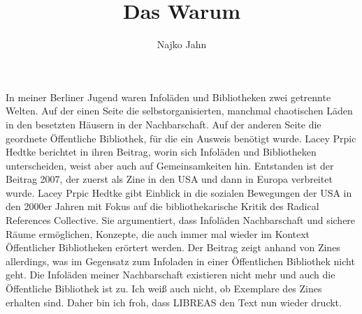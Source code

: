 \documentclass[output=paper,toc=false]{langsci/langscibook}
\title{Das Warum}
\author{Najko Jahn}
\begin{document}
\maketitle

\noindent  In meiner Berliner Jugend waren Infoläden und Bibliotheken zwei getrennte Welten. Auf der einen Seite die selbstorganisierten, manchmal chaotischen Läden in den besetzten Häusern in der Nachbarschaft. Auf der anderen Seite die geordnete Öffentliche Bibliothek, für die ein Ausweis benötigt wurde. Lacey Prpic Hedtke berichtet in ihren Beitrag, worin sich Infoläden und Bibliotheken unterscheiden, weist aber auch auf Gemeinsamkeiten hin. Entstanden ist der Beitrag 2007, der zuerst als Zine in den USA und dann in Europa verbreitet wurde. Lacey Prpic Hedtke gibt Einblick in die sozialen Bewegungen der USA in den 2000er Jahren mit Fokus auf die bibliothekarische Kritik des Radical References Collective. Sie argumentiert, dass Infoläden  Nachbarschaft und sichere Räume ermöglichen, Konzepte, die auch immer mal wieder im Kontext Öffentlicher Bibliotheken erörtert werden. Der Beitrag zeigt anhand von Zines allerdings, was im Gegensatz zum Infoladen in einer Öffentlichen Bibliothek nicht geht. Die Infoläden meiner Nachbarschaft existieren nicht mehr und auch die Öffentliche Bibliothek ist zu. Ich weiß auch nicht, ob Exemplare des Zines erhalten sind. Daher bin ich froh, dass LIBREAS den Text nun wieder druckt.
\end{document}
